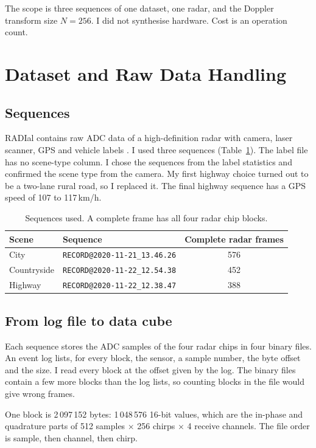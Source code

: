 \documentclass[10pt,a4paper]{article}
\begin{document}
The scope is three sequences of one dataset, one radar, and the Doppler transform size $N = 256$. I did not synthesise hardware. Cost is an operation count.

\section{Dataset and Raw Data Handling}
\subsection{Sequences}
RADIal contains raw ADC data of a high-definition radar with camera, laser scanner, GPS and vehicle labels \cite{rebut2022radial}. I used three sequences (Table~\ref{tab:seq}). The label file has no scene-type column. I chose the sequences from the label statistics and confirmed the scene type from the camera. My first highway choice turned out to be a two-lane rural road, so I replaced it. The final highway sequence has a GPS speed of 107 to 117\,km/h.

\begin{table}[h]
\caption{Sequences used. A complete frame has all four radar chip blocks.}
\label{tab:seq}
\centering
\begin{tabular}{llc}
\toprule
Scene & Sequence & Complete radar frames \\
\midrule
City & \texttt{RECORD@2020-11-21\_13.46.26} & 576 \\
Countryside & \texttt{RECORD@2020-11-22\_12.54.38} & 452 \\
Highway & \texttt{RECORD@2020-11-22\_12.38.47} & 388 \\
\bottomrule
\end{tabular}
\end{table}

\subsection{From log file to data cube}
Each sequence stores the ADC samples of the four radar chips in four binary files. An event log lists, for every block, the sensor, a sample number, the byte offset and the size. I read every block at the offset given by the log. The binary files contain a few more blocks than the log lists, so counting blocks in the file would give wrong frames.

One block is 2\,097\,152 bytes: 1\,048\,576 16-bit values, which are the in-phase and quadrature parts of 512 samples $\times$ 256 chirps $\times$ 4 receive channels. The file order is sample, then channel, then chirp.
\end{document}
